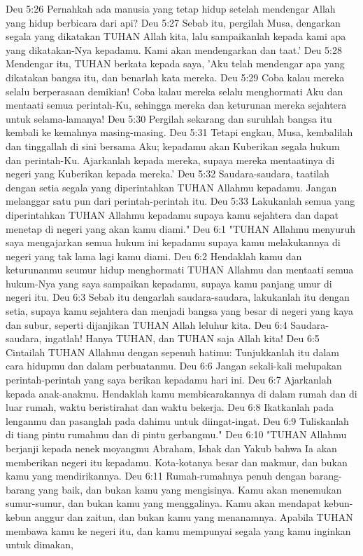Deu 5:26  Pernahkah ada manusia yang tetap hidup setelah mendengar Allah yang hidup berbicara dari api?
Deu 5:27  Sebab itu, pergilah Musa, dengarkan segala yang dikatakan TUHAN Allah kita, lalu sampaikanlah kepada kami apa yang dikatakan-Nya kepadamu. Kami akan mendengarkan dan taat.'
Deu 5:28  Mendengar itu, TUHAN berkata kepada saya, 'Aku telah mendengar apa yang dikatakan bangsa itu, dan benarlah kata mereka.
Deu 5:29  Coba kalau mereka selalu berperasaan demikian! Coba kalau mereka selalu menghormati Aku dan mentaati semua perintah-Ku, sehingga mereka dan keturunan mereka sejahtera untuk selama-lamanya!
Deu 5:30  Pergilah sekarang dan suruhlah bangsa itu kembali ke kemahnya masing-masing.
Deu 5:31  Tetapi engkau, Musa, kembalilah dan tinggallah di sini bersama Aku; kepadamu akan Kuberikan segala hukum dan perintah-Ku. Ajarkanlah kepada mereka, supaya mereka mentaatinya di negeri yang Kuberikan kepada mereka.'
Deu 5:32  Saudara-saudara, taatilah dengan setia segala yang diperintahkan TUHAN Allahmu kepadamu. Jangan melanggar satu pun dari perintah-perintah itu.
Deu 5:33  Lakukanlah semua yang diperintahkan TUHAN Allahmu kepadamu supaya kamu sejahtera dan dapat menetap di negeri yang akan kamu diami."
Deu 6:1  "TUHAN Allahmu menyuruh saya mengajarkan semua hukum ini kepadamu supaya kamu melakukannya di negeri yang tak lama lagi kamu diami.
Deu 6:2  Hendaklah kamu dan keturunanmu seumur hidup menghormati TUHAN Allahmu dan mentaati semua hukum-Nya yang saya sampaikan kepadamu, supaya kamu panjang umur di negeri itu.
Deu 6:3  Sebab itu dengarlah saudara-saudara, lakukanlah itu dengan setia, supaya kamu sejahtera dan menjadi bangsa yang besar di negeri yang kaya dan subur, seperti dijanjikan TUHAN Allah leluhur kita.
Deu 6:4  Saudara-saudara, ingatlah! Hanya TUHAN, dan TUHAN saja Allah kita!
Deu 6:5  Cintailah TUHAN Allahmu dengan sepenuh hatimu: Tunjukkanlah itu dalam cara hidupmu dan dalam perbuatanmu.
Deu 6:6  Jangan sekali-kali melupakan perintah-perintah yang saya berikan kepadamu hari ini.
Deu 6:7  Ajarkanlah kepada anak-anakmu. Hendaklah kamu membicarakannya di dalam rumah dan di luar rumah, waktu beristirahat dan waktu bekerja.
Deu 6:8  Ikatkanlah pada lenganmu dan pasanglah pada dahimu untuk diingat-ingat.
Deu 6:9  Tuliskanlah di tiang pintu rumahmu dan di pintu gerbangmu."
Deu 6:10  "TUHAN Allahmu berjanji kepada nenek moyangmu Abraham, Ishak dan Yakub bahwa Ia akan memberikan negeri itu kepadamu. Kota-kotanya besar dan makmur, dan bukan kamu yang mendirikannya.
Deu 6:11  Rumah-rumahnya penuh dengan barang-barang yang baik, dan bukan kamu yang mengisinya. Kamu akan menemukan sumur-sumur, dan bukan kamu yang menggalinya. Kamu akan mendapat kebun-kebun anggur dan zaitun, dan bukan kamu yang menanamnya. Apabila TUHAN membawa kamu ke negeri itu, dan kamu mempunyai segala yang kamu inginkan untuk dimakan,
